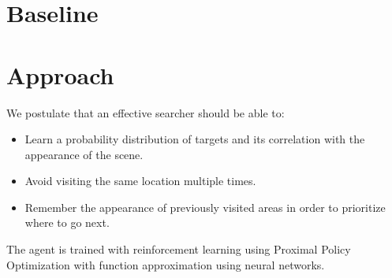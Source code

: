 
\section{Baseline}
\label{sec:baseline}

\section{Approach}
\label{sec:approach}







We postulate that an effective searcher should be able to:

\begin{itemize}
    \item Learn a probability distribution of targets and its correlation with the appearance of the scene.
    \item Avoid visiting the same location multiple times.
    \item Remember the appearance of previously visited areas in order to prioritize where to go next.
\end{itemize}



The agent is trained with reinforcement learning using Proximal Policy Optimization with function approximation using neural networks. 





